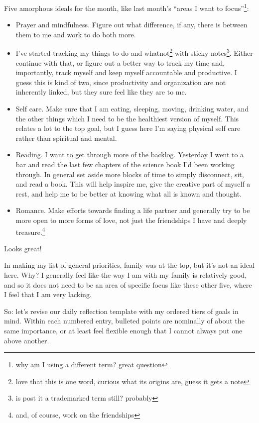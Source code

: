 \documentclass[12pt]{article}
\newcommand{\say}[1]{``#1''}
\renewcommand{\,}{\textsuperscript{,}}
\begin{document}
Five amorphous ideals for the month, like last month's \say{areas I want to focus}\footnote{why am I using a different term? great question}:  
\begin{itemize}  
\item Prayer and mindfulness. Figure out what difference, if any, there is between them to me and work to do both more.  
\item I've started tracking my things to do and whatnot\footnote{love that this is one word, curious what its origins are, guess it gets a note} with sticky notes\footnote{is post it a trademarked term still? probably}. Either continue with that, or figure out a better way to track my time and, importantly, track myself and keep myself accountable and productive. I guess this is kind of two, since productivity and organization are not inherently linked, but they sure feel like they are to me.  
\item Self care. Make sure that I am eating, sleeping, moving, drinking water, and the other things which I need to be the healthiest version of myself. This relates a lot to the top goal, but I guess here I'm saying physical self care rather than spiritual and mental.  
\item Reading. I want to get through more of the backlog. Yesterday I went to a bar and read the last few chapters of the science book I'd been working through. In general set aside more blocks of time to simply disconnect, sit, and read a book. This will help inspire me, give the creative part of myself a rest, and help me to be better at knowing what all is known and thought.  
\item Romance. Make efforts towards finding a life partner and generally try to be more open to more forms of love, not just the friendships I have and deeply treasure.\footnote{and, of course, work on the friendships}  
\end{itemize}

Looks great!

In making my list of general priorities, family was at the top, but it's not an ideal here.  
Why?  
I generally feel like the way I am with my family is relatively good, and so it does not need to be an area of specific focus like these other five, where I feel that I am very lacking.

So: let's revise our daily reflection template with my ordered tiers of goals in mind.  
Within each numbered entry, bulleted points are nominally of about the same importance, or at least feel flexible enough that I cannot always put one above another.
\end{document}
